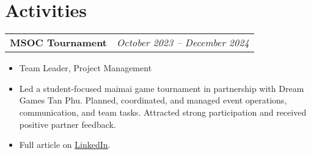 \documentclass[a4paper,11pt]{article}
\begin{document}
\section{Activities}
\begin{spacing}{1.05}
\begin{tabularx}{\linewidth}{@{}l r@{}}
  \textbf{MSOC Tournament} & \hspace*{0.54\linewidth}\normalsize\textit{October 2023 -- December 2024} \\
\end{tabularx}
\begin{itemize}[nosep,leftmargin=1.2em,itemsep=2pt]
  \item Team Leader, Project Management
  \item Led a student-focused maimai game tournament in partnership with Dream Games Tan Phu. Planned, coordinated, and managed event operations, communication, and team tasks. Attracted strong participation and received positive partner feedback. 
  \item Full article on \href{https://www.linkedin.com/feed/update/urn:li:activity:7300042302784233472/}{\underline{LinkedIn}}.
\end{itemize}
\end{spacing}



\vspace*{\fill}
\end{document}

